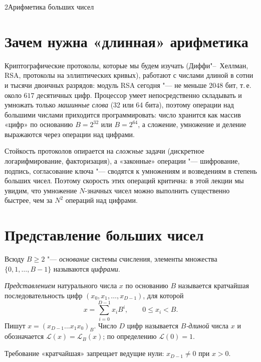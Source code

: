 \providecommand{\Len}{\mathcal{L}}
\begin{lecture}{2}{Арифметика больших чисел}

\section{Зачем нужна «длинная» арифметика}

Криптографические протоколы, которые мы будем изучать (Диффи"--~Хеллман, RSA, протоколы на
эллиптических кривых), работают с числами длиной в сотни и тысячи двоичных разрядов: модуль RSA
сегодня "--- не меньше $2048$ бит, т.\,е. около $617$ десятичных цифр. Процессор умеет
непосредственно складывать и умножать только \emph{машинные слова} (32 или 64 бита), поэтому
операции над большими числами приходится программировать: число хранится как массив «цифр»
по основанию $B = 2^{32}$ или $B = 2^{64}$, а сложение, умножение и деление выражаются через
операции над цифрами.

Стойкость протоколов опирается на \emph{сложные} задачи (дискретное логарифмирование,
факторизация), а «законные» операции "--- шифрование, подпись, согласование ключа "--- сводятся
к умножениям и возведениям в степень больших чисел. Поэтому скорость этих операций критична:
в этой лекции мы увидим, что умножение $N$-значных чисел можно выполнить существенно быстрее,
чем за $N^2$ операций над цифрами.

\section{Представление больших чисел}

Всюду $B \ge 2$ "--- \emph{основание} системы счисления, элементы множества
$\{0, 1, \dots, B - 1\}$ называются \emph{цифрами}.

\begin{definition}
\emph{Представлением} натурального числа $x$ по основанию $B$ называется кратчайшая
последовательность цифр $(x_0, x_1, \dots, x_{D-1})$, для которой
\[
  x = \sum_{i=0}^{D-1} x_i B^i, \qquad 0 \le x_i < B.
\]
Пишут $x = (x_{D-1} \dots x_1 x_0)_B$. Число $D$ цифр называется \emph{$B$-длиной} числа $x$
и обозначается $\Len(x) = \Len_B(x)$; по определению $\Len(0) = 1$.
\end{definition}

Требование «кратчайшая» запрещает ведущие нули: $x_{D-1} \ne 0$ при $x > 0$.


\end{lecture}
